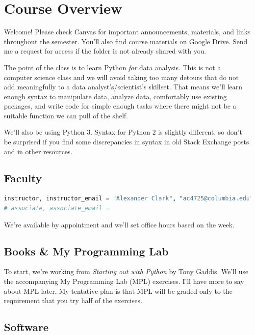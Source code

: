 \section{Course Overview}

Welcome! Please check Canvas for important announcements, materials, and links throughout the semester.
You'll also find course materials on Google Drive. Send me a request for access if the folder is not already shared with you. 

\smallskip
The point of the class is to learn Python \emph{for} \underline{data analysis}. 
This is not a computer science class and we will avoid taking too 
many detours that do not add meaningfully to a data analyst's/scientist's skillset. That means we'll learn 
enough syntax to manipulate data, analyze data, comfortably use existing packages, and write code for simple enough tasks where
there might not be a suitable function we can pull of the shelf.

\smallskip
We'll also be using Python 3. Syntax for Python 2 is slightly different, so don't be surprised if you find some
discrepancies in syntax in old Stack Exchange posts and in other resources. 


\subsection{Faculty}


\begin{lstlisting}[language = Python]
instructor, instructor_email = "Alexander Clark", "ac4725@columbia.edu"
# associate, associate_email = 
\end{lstlisting}

We're available by appointment and we'll set office hours based on the week.



\subsection{Books \& My Programming Lab}

To start, we're working from \emph{Starting out with Python} by Tony Gaddis. We'll use the accompanying My Programming Lab (MPL) exercises.
I'll have more to say about MPL later. My tentative plan is that MPL will be graded only to the requirement that you try half of the exercises.

\subsection{Software}

